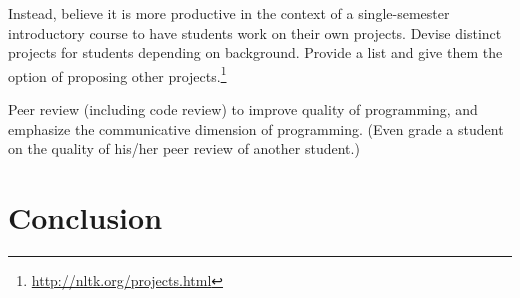 \documentclass[11pt]{article}
\begin{document}
Instead, believe it is more productive in the context of a single-semester introductory
course to have students work on their own projects.  Devise distinct projects for
students depending on background.  Provide a list and give them the option of proposing
other projects.\footnote{\url{http://nltk.org/projects.html}}

Peer review (including code review) to improve quality of programming, and
emphasize the communicative dimension of programming.
(Even grade a student on the quality of his/her peer review of another student.)

\section{Conclusion}




\end{document}
